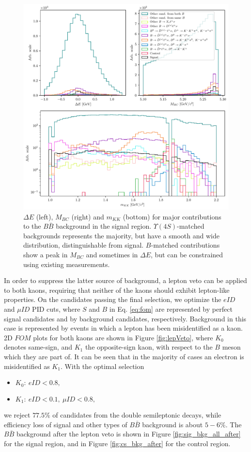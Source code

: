 \begin{figure}[H]
	\centering
	\captionsetup{width=0.8\linewidth}
	\includegraphics[width=\linewidth]{fig/sig_BKG_composition_all_before.pdf}
	\caption{$\Delta E$ (left), $M_{BC}$ (right) and $m_{KK}$ (bottom) for major contributions to the $B \bar B$ background in the signal region. $\Upsilon(4S)$-matched backgrounds represents the majority, but have a smooth and wide distribution, distinguishable from signal. $B$-matched contributions show a peak in $M_{BC}$ and sometimes in $\Delta E$, but can be constrained using existing measurements.}
	\label{fig:sig_bkg_all_before}
\end{figure} 

In order to suppress the latter source of background, a lepton veto can be applied to both kaons, requiring that neither of the kaons should exhibit lepton-like properties. On the candidates passing the final selection, we optimize the $eID$ and $\mu ID$ PID cuts, where $S$ and $B$ in Eq. \ref{eq:fom} are represented by perfect signal candidates and by background candidates, respectively. Background in this case is represented by events in which a lepton has been misidentified as a kaon. 2D $FOM$ plots for both kaons are shown in Figure \ref{fig:lepVeto}, where $K_0$ denotes same-sign, and $K_1$ the opposite-sign kaon, with respect to the $B$ meson which they are part of. It can be seen that in the majority of cases an electron is misidentified as $K_1$. With the optimal selection 
\begin{itemize}
	\item $K_0:~eID < 0.8,$
	\item $K_1:~eID < 0.1,~\mu ID < 0.8,$
\end{itemize}
we reject $77.5\%$ of candidates from the double semileptonic decays, while efficiency loss of signal and other types of $B \bar B$ background is about $5-6\%$. The $B \bar B$ background after the lepton veto is shown in Figure \ref{fig:sig_bkg_all_after} for the signal region, and in Figure \ref{fig:cs_bkg_after} for the control region.

